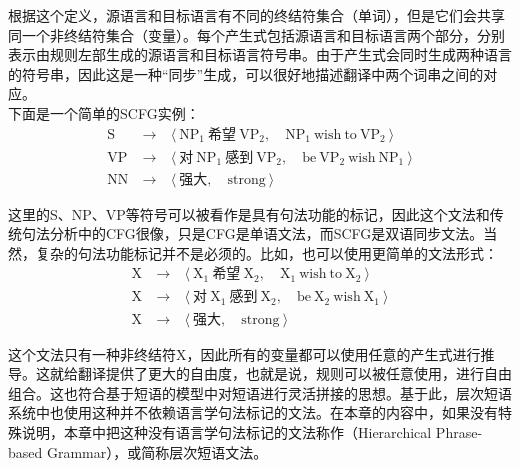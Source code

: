\parinterval 根据这个定义，源语言和目标语言有不同的终结符集合（单词），但是它们会共享同一个非终结符集合（变量）。每个产生式包括源语言和目标语言两个部分，分别表示由规则左部生成的源语言和目标语言符号串。由于产生式会同时生成两种语言的符号串，因此这是一种``同步''生成，可以很好地描述翻译中两个词串之间的对应。\\

\parinterval 下面是一个简单的SCFG实例：
\begin{eqnarray}
\textrm{S}\ &\to\ &\langle \ \textrm{NP}_1\ \text{希望}\ \textrm{VP}_2,\quad \textrm{NP}_1\ \textrm{wish}\ \textrm{to}\ \textrm{VP}_2\ \rangle \nonumber \\
\textrm{VP}\ &\to\ &\langle \ \text{对}\ \textrm{NP}_1\ \text{感到}\ \textrm{VP}_2,\quad \textrm{be}\ \textrm{VP}_2\ \textrm{wish}\ \textrm{NP}_1\ \rangle \nonumber \\
\textrm{NN}\ &\to\ &\langle \ \text{强大},\quad \textrm{strong}\ \rangle \nonumber
\end{eqnarray}

\parinterval 这里的S、NP、VP等符号可以被看作是具有句法功能的标记，因此这个文法和传统句法分析中的CFG很像，只是CFG是单语文法，而SCFG是双语同步文法。当然，复杂的句法功能标记并不是必须的。比如，也可以使用更简单的文法形式：
\begin{eqnarray}
\textrm{X}\ &\to\ &\langle \ \textrm{X}_1\ \text{希望}\ \textrm{X}_2,\quad \textrm{X}_1\ \textrm{wish}\ \textrm{to}\ \textrm{X}_2\ \rangle \nonumber \\
\textrm{X}\ &\to\ &\langle \ \text{对}\ \textrm{X}_1\ \text{感到}\ \textrm{X}_2,\quad \textrm{be}\ \textrm{X}_2\ \textrm{wish}\ \textrm{X}_1\ \rangle \nonumber \\
\textrm{X}\ &\to\ &\langle \ \text{强大},\quad \textrm{strong}\ \rangle \nonumber
\end{eqnarray}

\parinterval 这个文法只有一种非终结符X，因此所有的变量都可以使用任意的产生式进行推导。这就给翻译提供了更大的自由度，也就是说，规则可以被任意使用，进行自由组合。这也符合基于短语的模型中对短语进行灵活拼接的思想。基于此，层次短语系统中也使用这种并不依赖语言学句法标记的文法。在本章的内容中，如果没有特殊说明，本章中把这种没有语言学句法标记的文法称作{\small{}}（Hierarchical Phrase-based Grammar），或简称层次短语文法。


